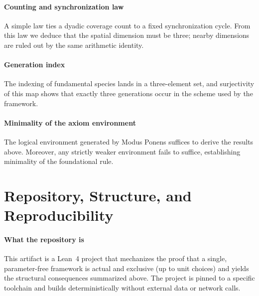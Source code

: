 \documentclass{article}
\begin{document}
\paragraph{Counting and synchronization law} A simple law ties a dyadic coverage count to a fixed synchronization cycle. From this law we deduce that the spatial dimension must be three; nearby dimensions are ruled out by the same arithmetic identity.

\paragraph{Generation index} The indexing of fundamental species lands in a three-element set, and surjectivity of this map shows that exactly three generations occur in the scheme used by the framework.

\paragraph{Minimality of the axiom environment} The logical environment generated by Modus Ponens suffices to derive the results above. Moreover, any strictly weaker environment fails to suffice, establishing minimality of the foundational rule.

\section{Repository, Structure, and Reproducibility}
\paragraph{What the repository is} This artifact is a Lean~4 project that mechanizes the proof that a single, parameter-free framework is actual and exclusive (up to unit choices) and yields the structural consequences summarized above. The project is pinned to a specific toolchain and builds deterministically without external data or network calls.
\end{document}
